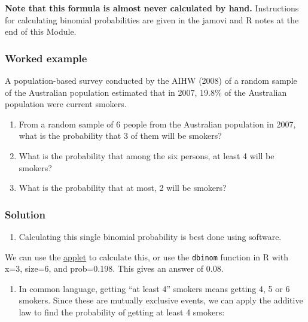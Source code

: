 \documentclass[
  a4paper,
]{memoir}
\providecommand{\tightlist}{%
  \setlength{\itemsep}{0pt}\setlength{\parskip}{0pt}}
\begin{document}
\textbf{Note that this formula is almost never calculated by hand.}
Instructions for calculating binomial probabilities are given in the
jamovi and R notes at the end of this Module.

\subsubsection*{Worked example}\label{worked-example}

A population-based survey conducted by the AIHW (2008) of a random
sample of the Australian population estimated that in 2007, 19.8\% of
the Australian population were current smokers.

\begin{enumerate}
\def\labelenumi{\alph{enumi})}
\tightlist
\item
  From a random sample of 6 people from the Australian population in
  2007, what is the probability that 3 of them will be smokers?
\item
  What is the probability that among the six persons, at least 4 will be
  smokers?
\item
  What is the probability that at most, 2 will be smokers?
\end{enumerate}

\subsubsection*{Solution}\label{solution}

\begin{enumerate}
\def\labelenumi{\alph{enumi})}
\tightlist
\item
  Calculating this single binomial probability is best done using
  software.
\end{enumerate}

We can use the \href{https://mabognar.github.io/apps/bin.html}{applet}
to calculate this, or use the \texttt{dbinom} function in R with x=3,
size=6, and prob=0.198. This gives an answer of 0.08.

\begin{enumerate}
\def\labelenumi{\alph{enumi})}
\setcounter{enumi}{1}
\tightlist
\item
  In common language, getting ``at least 4'' smokers means getting 4, 5
  or 6 smokers. Since these are mutually exclusive events, we can apply
  the additive law to find the probability of getting at least 4
  smokers:
\end{enumerate}
\end{document}
